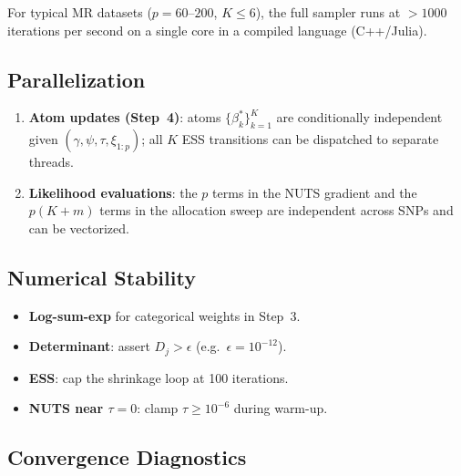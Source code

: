 \documentclass[12pt, a4paper]{article}
\theoremstyle{remark}
\begin{document}
For typical MR datasets ($p = 60$--$200$, $K \leq 6$), the full
sampler runs at $>1000$ iterations per second on a single core in
a compiled language (C++/Julia).

\subsection{Parallelization}

\begin{enumerate}[leftmargin=*, itemsep=3pt]
  \item \textbf{Atom updates (Step~4)}: atoms $\{\beta_k^*\}_{k=1}^K$
        are conditionally independent given $(\gamma,\psi,\tau,\xi_{1:p})$;
        all $K$ ESS transitions can be dispatched to separate threads.
  \item \textbf{Likelihood evaluations}: the $p$ terms in the NUTS
        gradient and the $p(K+m)$ terms in the allocation sweep are
        independent across SNPs and can be vectorized.
\end{enumerate}

\subsection{Numerical Stability}

\begin{itemize}[leftmargin=*, itemsep=3pt]
  \item \textbf{Log-sum-exp} for categorical weights in Step~3.
  \item \textbf{Determinant}: assert $D_j > \epsilon$ (e.g.\
        $\epsilon = 10^{-12}$).
  \item \textbf{ESS}: cap the shrinkage loop at 100 iterations.
  \item \textbf{NUTS near $\tau = 0$}: clamp $\tau \geq 10^{-6}$
        during warm-up.
\end{itemize}

\subsection{Convergence Diagnostics}
\end{document}
